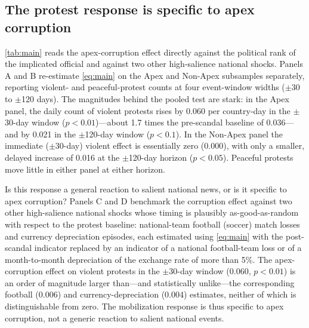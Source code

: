 \documentclass[11pt]{article}
\begin{document}
\subsection{The protest response is specific to apex corruption}

\autoref{tab:main} reads the apex-corruption effect directly against the political rank of the implicated official and against two other high-salience national shocks. Panels A and B re-estimate \autoref{eq:main} on the Apex and Non-Apex subsamples separately, reporting violent- and peaceful-protest counts at four event-window widths ($\pm$30 to $\pm$120 days). The magnitudes behind the pooled test are stark: in the Apex panel, the daily count of violent protests rises by 0.060 per country-day in the $\pm$30-day window ($p<0.01$)---about 1.7 times the pre-scandal baseline of 0.036---and by 0.021 in the $\pm$120-day window ($p<0.1$). In the Non-Apex panel the immediate ($\pm$30-day) violent effect is essentially zero (0.000), with only a smaller, delayed increase of 0.016 at the $\pm$120-day horizon ($p<0.05$). Peaceful protests move little in either panel at either horizon.

Is this response a general reaction to salient national news, or is it specific to apex corruption? Panels C and D benchmark the corruption effect against two other high-salience national shocks whose timing is plausibly as-good-as-random with respect to the protest baseline: national-team football (soccer) match losses and currency depreciation episodes, each estimated using \autoref{eq:main} with the post-scandal indicator replaced by an indicator of a national football-team loss or of a month-to-month depreciation of the exchange rate of more than 5\%. The apex-corruption effect on violent protests in the $\pm$30-day window (0.060, $p<0.01$) is an order of magnitude larger than---and statistically unlike---the corresponding football (0.006) and currency-depreciation (0.004) estimates, neither of which is distinguishable from zero. The mobilization response is thus specific to apex corruption, not a generic reaction to salient national events.
\end{document}
